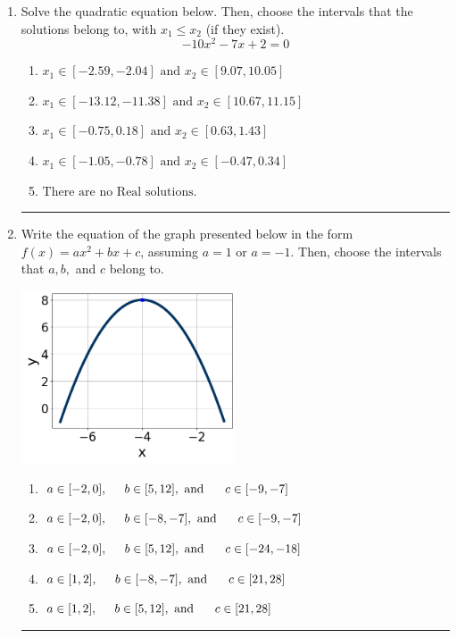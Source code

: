 \documentclass[14pt]{extbook}
\newcommand{\litem}[1]{\item#1\hspace*{-1cm}\rule{\textwidth}{0.4pt}}
\begin{document}
\begin{enumerate}
{\begin{enumerate}[label=\Alph*.]
\end{enumerate} }
\litem{
Solve the quadratic equation below. Then, choose the intervals that the solutions belong to, with $x_1 \leq x_2$ (if they exist).\[ -10x^{2} -7 x + 2 = 0 \]\begin{enumerate}[label=\Alph*.]
\item \( x_1 \in [-2.59, -2.04] \text{ and } x_2 \in [9.07, 10.05] \)
\item \( x_1 \in [-13.12, -11.38] \text{ and } x_2 \in [10.67, 11.15] \)
\item \( x_1 \in [-0.75, 0.18] \text{ and } x_2 \in [0.63, 1.43] \)
\item \( x_1 \in [-1.05, -0.78] \text{ and } x_2 \in [-0.47, 0.34] \)
\item \( \text{There are no Real solutions.} \)

\end{enumerate} }
\litem{
Write the equation of the graph presented below in the form $f(x)=ax^2+bx+c$, assuming  $a=1$ or $a=-1$. Then, choose the intervals that $a, b,$ and $c$ belong to.
\begin{center}
    \includegraphics[width=0.5\textwidth]{../Figures/quadraticGraphToEquationCopyC.png}
\end{center}
\begin{enumerate}[label=\Alph*.]
\item \( a \in [-2, 0], \hspace*{5mm} b \in [5, 12], \text{ and } \hspace*{5mm} c \in [-9, -7] \)
\item \( a \in [-2, 0], \hspace*{5mm} b \in [-8, -7], \text{ and } \hspace*{5mm} c \in [-9, -7] \)
\item \( a \in [-2, 0], \hspace*{5mm} b \in [5, 12], \text{ and } \hspace*{5mm} c \in [-24, -18] \)
\item \( a \in [1, 2], \hspace*{5mm} b \in [-8, -7], \text{ and } \hspace*{5mm} c \in [21, 28] \)
\item \( a \in [1, 2], \hspace*{5mm} b \in [5, 12], \text{ and } \hspace*{5mm} c \in [21, 28] \)


\end{enumerate}}
\end{enumerate}
\end{document}
